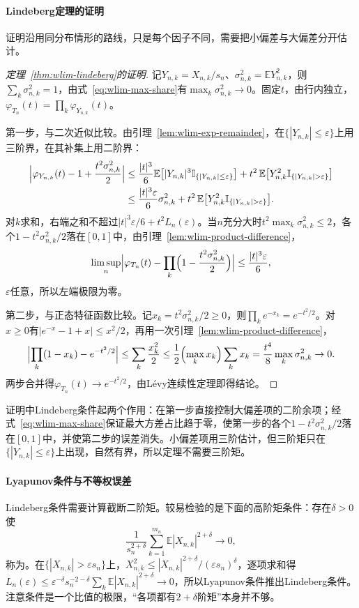 \paragraph{Lindeberg定理的证明}
证明沿用同分布情形的路线，只是每个因子不同，需要把小偏差与大偏差分开估计。

\begin{proof}[定理~\ref{thm:wlim-lindeberg}的证明]
记$Y_{n,k}=X_{n,k}/s_n$、$\sigma_{n,k}^2=\mathbb E Y_{n,k}^2$，则$\sum_k\sigma_{n,k}^2=1$，由式~\eqref{eq:wlim-max-share}有$\max_k\sigma_{n,k}^2\to0$。固定$t$，由行内独立，$\varphi_{T_n}(t)=\prod_k\varphi_{Y_{n,k}}(t)$。

第一步，与二次近似比较。由引理~\ref{lem:wlim-exp-remainder}，在$\{|Y_{n,k}|\leq\varepsilon\}$上用三阶界，在其补集上用二阶界：
\[
  \begin{aligned}
  \Bigl|\varphi_{Y_{n,k}}(t)-1+\frac{t^2\sigma_{n,k}^2}2\Bigr|
  &\leq\frac{|t|^3}6\mathbb E\bigl[|Y_{n,k}|^3\mathbb I_{\{|Y_{n,k}|\leq\varepsilon\}}\bigr]+t^2\,\mathbb E\bigl[Y_{n,k}^2\mathbb I_{\{|Y_{n,k}|>\varepsilon\}}\bigr]\\
  &\leq\frac{|t|^3\varepsilon}6\sigma_{n,k}^2+t^2\,\mathbb E\bigl[Y_{n,k}^2\mathbb I_{\{|Y_{n,k}|>\varepsilon\}}\bigr].
  \end{aligned}
\]
对$k$求和，右端之和不超过$|t|^3\varepsilon/6+t^2L_n(\varepsilon)$。当$n$充分大时$t^2\max_k\sigma_{n,k}^2\leq2$，各个$1-t^2\sigma_{n,k}^2/2$落在$[0,1]$中，由引理~\ref{lem:wlim-product-difference}，
\[
  \limsup_n\Bigl|\varphi_{T_n}(t)-\prod_k\Bigl(1-\frac{t^2\sigma_{n,k}^2}2\Bigr)\Bigr|\leq\frac{|t|^3\varepsilon}6,
\]
$\varepsilon$任意，所以左端极限为零。

第二步，与正态特征函数比较。记$x_k=t^2\sigma_{n,k}^2/2\geq0$，则$\prod_ke^{-x_k}=e^{-t^2/2}$。对$x\geq0$有$|e^{-x}-1+x|\leq x^2/2$，再用一次引理~\ref{lem:wlim-product-difference}，
\[
  \Bigl|\prod_k(1-x_k)-e^{-t^2/2}\Bigr|\leq\sum_k\frac{x_k^2}2\leq\frac12\Bigl(\max_kx_k\Bigr)\sum_kx_k=\frac{t^4}8\max_k\sigma_{n,k}^2\to0.
\]
两步合并得$\varphi_{T_n}(t)\to e^{-t^2/2}$，由L\'evy连续性定理即得结论。
\end{proof}

证明中Lindeberg条件起两个作用：在第一步直接控制大偏差项的二阶余项；经式~\eqref{eq:wlim-max-share}保证最大方差占比趋于零，使第一步的各个$1-t^2\sigma_{n,k}^2/2$落在$[0,1]$中，并使第二步的误差消失。小偏差项用三阶估计，但三阶矩只在$\{|Y_{n,k}|\leq\varepsilon\}$上出现，自然有界，所以定理不需要三阶矩。

\paragraph{Lyapunov条件与不等权误差}
Lindeberg条件需要计算截断二阶矩。较易检验的是下面的高阶矩条件：存在$\delta>0$使
\[
  \frac1{s_n^{2+\delta}}\sum_{k=1}^{m_n}\mathbb E|X_{n,k}|^{2+\delta}\to0,
\]
称为。在$\{|X_{n,k}|>\varepsilon s_n\}$上，$X_{n,k}^2\leq|X_{n,k}|^{2+\delta}/(\varepsilon s_n)^\delta$，逐项求和得$L_n(\varepsilon)\leq\varepsilon^{-\delta}s_n^{-2-\delta}\sum_k\mathbb E|X_{n,k}|^{2+\delta}\to0$，所以Lyapunov条件推出Lindeberg条件。
注意条件是一个比值的极限，“各项都有$2+\delta$阶矩”本身并不够。

